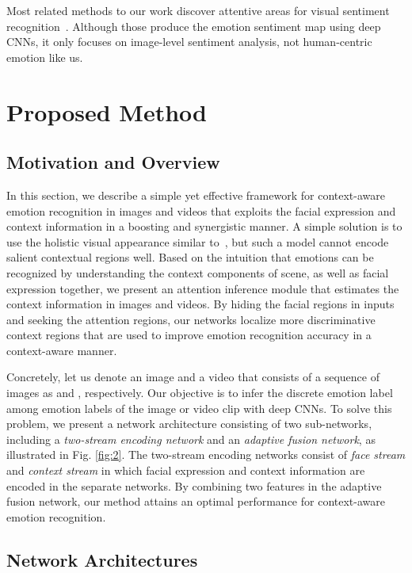 \documentclass[10pt,twocolumn,letterpaper]{article}
\newcommand{\figref}[1]{Fig. \ref{#1}}
\begin{document}
Most related methods to our work discover attentive areas for visual sentiment recognition~\cite{yang2018weakly,you2017visual}.
Although those produce the emotion sentiment map using deep CNNs, it only focuses on image-level sentiment analysis, not human-centric emotion like us.

\section{Proposed Method}\label{sec:3}
\subsection{Motivation and Overview}\label{sec:31}
In this section, we describe a simple yet effective framework for context-aware emotion recognition in images and videos that exploits the facial expression and context information in a boosting and synergistic manner.
A simple solution is to use the holistic visual appearance similar to~\cite{kosti2017emotion,chen2016emotion}, but such a model cannot encode salient contextual regions well. Based on the intuition that emotions can be recognized by understanding the context components of scene, as well as facial expression together, we present an attention inference module that estimates the context information in images and videos. By hiding the facial regions in inputs and seeking the attention regions, our networks localize more discriminative context regions that are used to improve emotion recognition accuracy in a context-aware manner.

Concretely, let us denote an image and a video that consists of a sequence of  images as  and , respectively.
Our objective is to infer the discrete emotion label  among  emotion labels  of the image  or video clip  with deep CNNs. To solve this problem, we present a network architecture consisting of two sub-networks, including a \textit{two-stream encoding network} and an \textit{adaptive fusion network}, as illustrated in \figref{fig:2}. The two-stream encoding networks consist of \textit{face stream} and \textit{context stream} in which facial expression and context information are encoded in the separate networks. By combining two features in the adaptive fusion network, our method attains an optimal performance for context-aware emotion recognition.

\subsection{Network Architectures}\label{sec:32}
\end{document}
